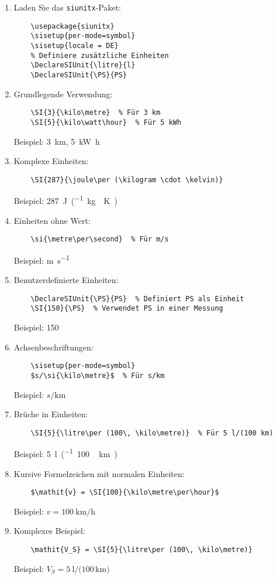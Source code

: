 \documentclass[a4paper,BCOR=12mm]{scrartcl}  %
\begin{document}
\begin{enumerate}
    \item Laden Sie das \texttt{siunitx}-Paket:
    \begin{verbatim}
    \usepackage{siunitx}
    \sisetup{per-mode=symbol}
    \sisetup{locale = DE}
    % Definiere zusätzliche Einheiten
    \DeclareSIUnit{\litre}{l}
    \DeclareSIUnit{\PS}{PS}
    \end{verbatim}

    \item Grundlegende Verwendung:
    \begin{verbatim}
    \SI{3}{\kilo\metre}  % Für 3 km
    \SI{5}{\kilo\watt\hour}  % Für 5 kWh
    \end{verbatim}
    Beispiel: \SI{3}{\kilo\metre}, \SI{5}{\kilo\watt\hour}

    \item Komplexe Einheiten:
    \begin{verbatim}
    \SI{287}{\joule\per (\kilogram \cdot \kelvin)}
    \end{verbatim}
    Beispiel: \SI{287}{\joule\per (\kilogram \cdot \kelvin)}

    \item Einheiten ohne Wert:
    \begin{verbatim}
    \si{\metre\per\second}  % Für m/s
    \end{verbatim}
    Beispiel: \si{\metre\per\second}

    \item Benutzerdefinierte Einheiten:
    \begin{verbatim}
    \DeclareSIUnit{\PS}{PS}  % Definiert PS als Einheit
    \SI{150}{\PS}  % Verwendet PS in einer Messung
    \end{verbatim}
    Beispiel: \SI{150}{\PS}

    \item Achsenbeschriftungen:
    \begin{verbatim}
    \sisetup{per-mode=symbol}
    $s/\si{\kilo\metre}$  % Für s/km
    \end{verbatim}
    Beispiel: $s/\si{\kilo\metre}$

    \item Brüche in Einheiten:
    \begin{verbatim}
    \SI{5}{\litre\per (100\, \kilo\metre)}  % Für 5 l/(100 km)
    \end{verbatim}
    Beispiel: \SI{5}{\litre\per (100\, \kilo\metre)}

    \item Kursive Formelzeichen mit normalen Einheiten:
    \begin{verbatim}
    $\mathit{v} = \SI{100}{\kilo\metre\per\hour}$
    \end{verbatim}
    Beispiel: $\mathit{v} = \SI{100}{\kilo\metre\per\hour}$

    \item Komplexes Beispiel:
    \begin{verbatim}
    \mathit{V_S} = \SI{5}{\litre\per (100\, \kilo\metre)}
    \end{verbatim}
    Beispiel: $\mathit{V_S} = \SI{5}{\litre\per (100\, \kilo\metre)}$
\end{enumerate}
\end{document}
